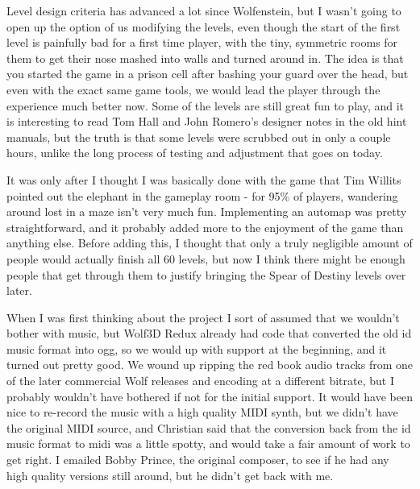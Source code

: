 Level design criteria has advanced a lot since Wolfenstein, but I wasn't going to open up the option of us modifying the levels, even though the start of the first level is painfully bad for a first time player, with the tiny, symmetric rooms for them to get their nose mashed into walls and turned around in.  The idea is that you started the game in a prison cell after bashing your guard over the head, but even with the exact same game tools, we would lead the player through the experience much better now.  Some of the levels are still great fun to play, and it is interesting to read Tom Hall and John Romero's designer notes in the old hint manuals, but the truth is that some levels were scrubbed out in only a couple hours, unlike the long process of testing and adjustment that goes on today.\\
\par

It was only after I thought I was basically done with the game that Tim Willits pointed out the elephant in the gameplay room - for 95\% of players, wandering around lost in a maze isn't very much fun.
Implementing an automap was pretty straightforward, and it probably added more to the enjoyment of the game than anything else.  Before adding this, I thought that only a truly negligible amount of people would actually finish all 60 levels, but now I think there might be enough people that get through them to justify bringing the Spear of Destiny levels over later.\\
\par

When I was first thinking about the project I sort of assumed that we wouldn't bother with music, but Wolf3D Redux already had code that converted the old id music format into ogg, so we would up with support at the beginning, and it turned out pretty good.  We wound up ripping the red book audio tracks from one of the later commercial Wolf releases and encoding at a different bitrate, but I probably wouldn't have bothered if not for the initial support.  It would have been nice to re-record the music with a high quality MIDI synth, but we didn't have the original MIDI source, and Christian said that the conversion back from the id music format to midi was a little spotty, and would take a fair amount of work to get right.  I emailed Bobby Prince, the original composer, to see if he had any high quality versions still around, but he didn't get back with me.\\
\par

